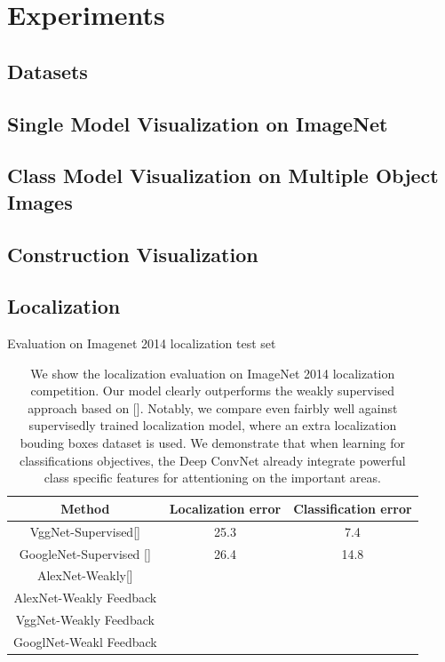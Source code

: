 \section{Experiments}



\subsection{Datasets}

\subsection{Single Model Visualization on ImageNet}

\subsection{Class Model Visualization on Multiple Object Images}

\subsection{Construction Visualization}

\subsection{Localization}

\begin{table}
\centering
Evaluation on Imagenet 2014 localization test set
\begin{tabular}{|c|c|c|}
\hline
Method & Localization error & Classification error\\
\hline
VggNet-Supervised[] & 25.3 & 7.4 \\
GoogleNet-Supervised [] & 26.4 & 14.8 \\
AlexNet-Weakly[] & & \\
AlexNet-Weakly Feedback & & \\
VggNet-Weakly Feedback & & \\
GooglNet-Weakl Feedback & & \\
\hline
\end{tabular}
\caption{We show the localization evaluation on ImageNet 2014 localization competition. Our model clearly outperforms the weakly supervised approach based on []. Notably, we compare even fairbly well against supervisedly trained localization model, where an extra localization bouding boxes dataset is used. We demonstrate that when learning for classifications objectives, the Deep ConvNet already integrate powerful class specific features for attentioning on the important areas.}
\label{tab:localization_accuracy}
\end{table}

